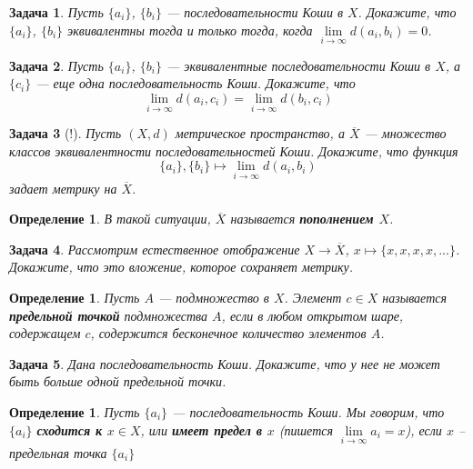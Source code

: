 \documentclass[12pt]{book}
\theoremstyle{upshape}
\newtheorem{zadacha}{Задача}[chapter]
\theoremstyle{generic}
\newtheorem{opredelenie}[teorema]{Определение}
\theoremstyle{upshapenonumber}
\newcommand{\следствие}{%
     \refstepcounter{teorema}
     {\noindent\bf Следствие \thechapter.\arabic{teorema}:\ }}
\newcommand{\пример}{%
     \refstepcounter{teorema}
     {\noindent\bf Пример \thechapter.\arabic{teorema}:\ }}
\newcommand{\лемма}{%
     \refstepcounter{teorema}
     {\noindent\bf Лемма \thechapter.\arabic{teorema}:\ }}
\newcommand{\теорема}{%
     \refstepcounter{teorema}
     {\noindent\bf Теорема \thechapter.\arabic{teorema}:\ }}
\newcommand{\утверждение}{%
     \refstepcounter{teorema}
     {\noindent\bf Утверждение \thechapter.\arabic{teorema}:\ }}
\begin{document}
{\begin{zadacha} Пусть $\{a_i\}$, $\{b_i\}$ --- последовательности
Коши в $X$. Докажите, что $\{a_i\}$, $\{b_i\}$ эквивалентны тогда и
только тогда, когда $\lim\limits_{i\to \infty} d(a_i, b_i) =0$.
\end{zadacha}

\begin{zadacha} Пусть $\{a_i\}$, $\{b_i\}$ --- эквивалентные
последовательности Коши в $X$, а $\{c_i\}$ --- еще одна
последовательность Коши. Докажите, что
$$
\lim\limits_{i\to \infty} d(a_i, c_i)=
   \lim\limits_{i\to \infty} d(b_i, c_i)
$$
\end{zadacha}

\begin{zadacha}[!] Пусть $(X, d)$ метрическое пространство, а
$\overline{X}$ --- множество классов эквивалентности
последовательностей Коши. Докажите, что функция
$$
\{a_i\}, \{b_i\} \mapsto \lim\limits_{i\to \infty} d(a_i, b_i)
$$
задает метрику на $\overline X$.
\end{zadacha}

\begin{opredelenie}\label{compl.bad.defn} 
В такой ситуации, $\overline{X}$ называется {\bf пополнением $X$}.
\end{opredelenie}

\begin{zadacha} Рассмотрим естественное отображение
$X \to \overline{X}$, $x \mapsto \{ x, x, x, x, ...\}$. Докажите, что
это вложение, которое сохраняет метрику.
\end{zadacha}

\begin{opredelenie} Пусть $A$ --- подмножество в $X$.
Элемент $c\in X$ называется {\bf предельной точкой} подмножества
$A$, если в любом открытом шаре, содержащем $c$, содержится
бесконечное количество элементов $A$.
\end{opredelenie}

\begin{zadacha} Дана последовательность Коши. Докажите, что
у нее не может быть больше одной предельной точки.
\end{zadacha}

\begin{opredelenie} Пусть $\{a_i\}$ --- последовательность
Коши. Мы говорим, что $\{a_i\}$ {\bf сходится к $x\in X$}, или {\bf
имеет предел в $x$} (пишется $\lim\limits_{i\to \infty} a_i =x$), если $x$
-- предельная точка $\{a_i\}$
\end{opredelenie}

}
\end{document}
